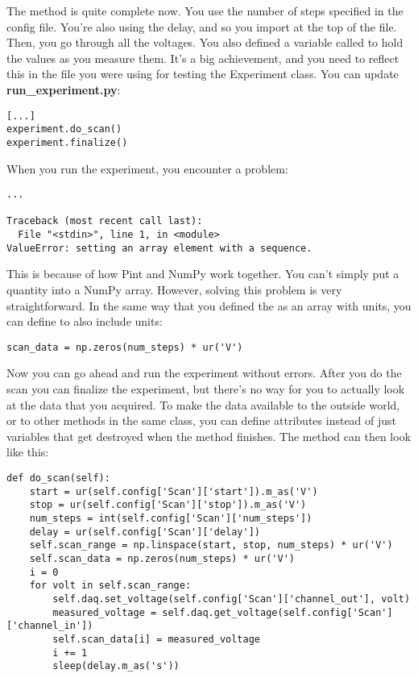 The  method is quite complete now. You use the number of steps specified in the config file. You're also using the delay, and so you import  at the top of the file. Then, you go through all the voltages. You also defined a variable called  to hold the values as you measure them. It's a big achievement, and you need to reflect this in the file you were using for testing the Experiment class. You can update \textbf{run\_experiment.py}:

\begin{verbatim}
[...]
experiment.do_scan()
experiment.finalize()
\end{verbatim}

When you run the experiment, you encounter a problem:

\begin{verbatim}
...

Traceback (most recent call last):
  File "<stdin>", line 1, in <module>
ValueError: setting an array element with a sequence.
\end{verbatim}

This is because of how Pint and NumPy work together. You can't simply put a quantity into a NumPy array. However, solving this problem is very straightforward. In the same way that you defined the  as an array with units, you can define  to also include units:

\begin{verbatim}
scan_data = np.zeros(num_steps) * ur('V')
\end{verbatim}

Now you can go ahead and run the experiment without errors. After you do the scan you can finalize the experiment, but there's no way for you to actually look at the data that you acquired. To make the data available to the outside world, or to other methods in the same class, you can define attributes instead of just variables that get destroyed when the method finishes. The  method can then look like this:

\begin{verbatim}
def do_scan(self):
    start = ur(self.config['Scan']['start']).m_as('V')
    stop = ur(self.config['Scan']['stop']).m_as('V')
    num_steps = int(self.config['Scan']['num_steps'])
    delay = ur(self.config['Scan']['delay'])
    self.scan_range = np.linspace(start, stop, num_steps) * ur('V')
    self.scan_data = np.zeros(num_steps) * ur('V')
    i = 0
    for volt in self.scan_range:
        self.daq.set_voltage(self.config['Scan']['channel_out'], volt)
        measured_voltage = self.daq.get_voltage(self.config['Scan']['channel_in'])
        self.scan_data[i] = measured_voltage
        i += 1
        sleep(delay.m_as('s'))
\end{verbatim}

